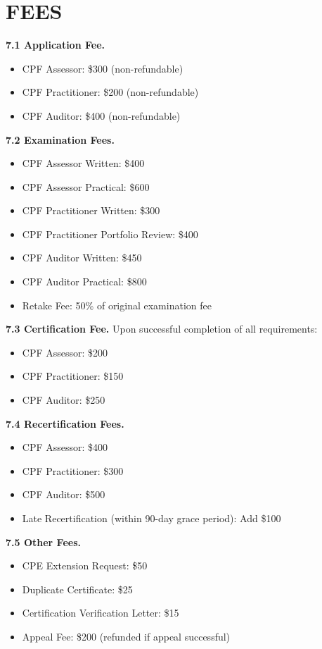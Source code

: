 \documentclass[11pt,a4paper]{article}
\begin{document}
\section{FEES}

\textbf{7.1 Application Fee.}
\begin{itemize}
\item CPF Assessor: \$300 (non-refundable)
\item CPF Practitioner: \$200 (non-refundable)
\item CPF Auditor: \$400 (non-refundable)
\end{itemize}

\textbf{7.2 Examination Fees.}
\begin{itemize}
\item CPF Assessor Written: \$400
\item CPF Assessor Practical: \$600
\item CPF Practitioner Written: \$300
\item CPF Practitioner Portfolio Review: \$400
\item CPF Auditor Written: \$450
\item CPF Auditor Practical: \$800
\item Retake Fee: 50\% of original examination fee
\end{itemize}

\textbf{7.3 Certification Fee.} Upon successful completion of all requirements:
\begin{itemize}
\item CPF Assessor: \$200
\item CPF Practitioner: \$150
\item CPF Auditor: \$250
\end{itemize}

\textbf{7.4 Recertification Fees.}
\begin{itemize}
\item CPF Assessor: \$400
\item CPF Practitioner: \$300
\item CPF Auditor: \$500
\item Late Recertification (within 90-day grace period): Add \$100
\end{itemize}

\textbf{7.5 Other Fees.}
\begin{itemize}
\item CPE Extension Request: \$50
\item Duplicate Certificate: \$25
\item Certification Verification Letter: \$15
\item Appeal Fee: \$200 (refunded if appeal successful)
\end{itemize}
\end{document}
